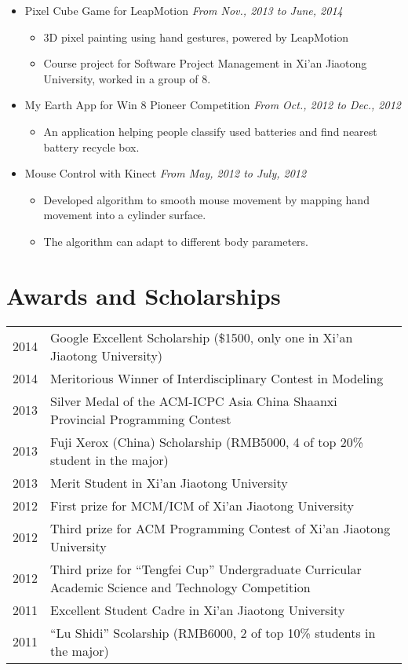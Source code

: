 \documentclass[a4paper,11pt]{article}
\begin{document}
\begin{itemize}
    \item Pixel Cube Game for LeapMotion \hfill \textit{From Nov., 2013 to June, 2014}
    \begin{itemize}
        \item 3D pixel painting using hand gestures, powered by LeapMotion
        \item Course project for Software Project Management in Xi'an Jiaotong University, worked in a group
of 8.
    \end{itemize}

    \item My Earth App for Win 8 Pioneer Competition \hfill \textit{From Oct., 2012 to Dec., 2012}
    \begin{itemize}
        \item An application helping people classify used batteries and find nearest battery recycle box.
    \end{itemize}

    \item Mouse Control with Kinect \hfill \textit{From May, 2012 to July, 2012}
    \begin{itemize}
        \item Developed algorithm to smooth mouse movement by mapping hand movement into a cylinder surface.
        \item The algorithm can adapt to different body parameters.
    \end{itemize}
\end{itemize}


\section{Awards and Scholarships}

\begin{tabular}{lp{15cm}}
    2014 & Google Excellent Scholarship (\$1500, only one in Xi'an Jiaotong University) \\
    2014 & Meritorious Winner of Interdisciplinary Contest in Modeling \\
    2013 & Silver Medal of the ACM-ICPC Asia China
            \newline Shaanxi Provincial Programming Contest \\
    2013 & Fuji Xerox (China) Scholarship (RMB5000, 4 of top 20\% student in the major) \\
    2013 & Merit Student in Xi'an Jiaotong University \\
    2012 & First prize for MCM/ICM of Xi'an Jiaotong University \\
    2012 & Third prize for ACM Programming Contest of Xi'an Jiaotong University \\
    2012 & Third prize for ``Tengfei Cup'' Undergraduate
            \newline Curricular Academic Science and Technology Competition \\
    2011 & Excellent Student Cadre in Xi'an Jiaotong University  \\
    2011 & ``Lu Shidi'' Scolarship (RMB6000, 2 of top 10\% students in the major)
\end{tabular}
\end{document}
